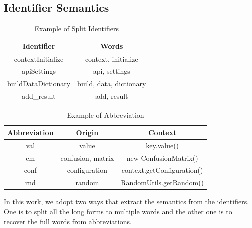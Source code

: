 \subsection{Identifier Semantics}\label{sec:identifier}

\begin{table}[ht]
\centering
\scriptsize{
\caption{\label{table:splitID} Example of Split Identifiers}
\begin{tabular}{|c|c|}
\hline
Identifier & Words \\
\hline
contextInitialize & context, initialize\\
\hline
apiSettings & api, settings\\
\hline
buildDataDictionary & build, data, dictionary\\
\hline
add\_result & add, result\\
\hline
\end{tabular}
}
\end{table}

\begin{table}[ht]
\centering
\scriptsize{
\caption{Example of Abbreviation}
\label{table:abbr}
\begin{tabular}{|c|c|c|}
\hline
Abbreviation & Origin & Context\\
\hline
val & value & key.value()\\
\hline
cm & confusion, matrix & new ConfusionMatrix()\\
\hline
conf & configuration & context.getConfiguration()\\
\hline
rnd & random & RandomUtils.getRandom()\\
\hline
\end{tabular}
}
\end{table}

In this work, we adopt two ways that extract the semantics from the identifiers.
One is to split all the long forms to multiple words and
the other one is to recover the full words from abbreviations.

